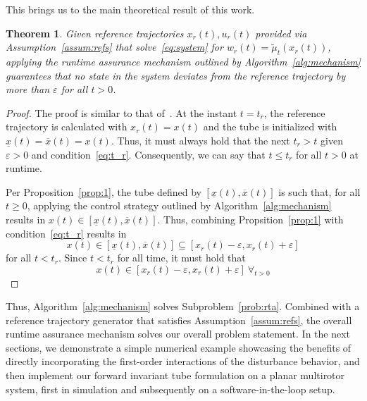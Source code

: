 \documentclass{IEEEojcsys}
\newcommand{\ul}{\underline}
\newtheorem{theorem}{Theorem}
\newcommand{\ol}{\overline}
\begin{document}
This brings us to the main theoretical result of this work.
\begin{theorem}
    Given reference trajectories $x_r(t), u_r(t)$ provided via Assumption~\ref{assum:refs} that solve~\eqref{eq:system} for $w_r(t) = \widetilde{\mu}_t(x_r(t))$, applying the runtime assurance mechanism outlined by Algorithm~\ref{alg:mechanism} guarantees that no state in the system deviates from the reference trajectory by more than $\varepsilon$ for all $t > 0$.
\end{theorem}
\begin{proof}
    The proof is similar to that of~\cite[Theorem 1]{caoICRARTA}. At the instant $t=t_r$, the reference trajectory is calculated with $x_r(t) = x(t)$ and the tube is initialized with $\ul{x}(t) = \ol{x}(t) = x(t)$. Thus, it must always hold that the next $t_r > t$ given $\varepsilon > 0$ and condition~\eqref{eq:t_r}. Consequently, we can say that $t \leq t_r$ for all $t > 0$ at runtime. 
    
    Per Proposition~\ref{prop:1}, the tube defined by $[\ul{x}(t), \ol{x}(t)]$ is such that, for all $t \geq 0$, applying the control strategy outlined by Algorithm~\ref{alg:mechanism} results in $x(t) \in [\ul{x}(t), \ol{x}(t)]$. Thus, combining Propsition~\ref{prop:1} with condition~\eqref{eq:t_r} results in
    \begin{equation}
        x(t) \in [\ul{x}(t), \ol{x}(t)] \subseteq [x_r(t) - \varepsilon, x_r(t) + \varepsilon]
    \end{equation}
    for all $t < t_r$. Since $t < t_r$ for all time, it must hold that
    \begin{equation}
        x(t) \in [x_r(t) - \varepsilon, x_r(t) + \varepsilon]\ \forall_{t > 0}
    \end{equation}
\end{proof}
Thus, Algorithm~\ref{alg:mechanism} solves Subproblem~\ref{prob:rta}. Combined with a reference trajectory generator that satisfies Assumption~\ref{assum:refs}, the overall runtime assurance mechanism solves our overall problem statement.
In the next sections, 
we demonstrate a simple numerical example showcasing the benefits of directly incorporating the first-order interactions of the disturbance behavior, and then implement our forward invariant tube formulation on a planar multirotor system, first in simulation and subsequently on a software-in-the-loop setup.
\end{document}
